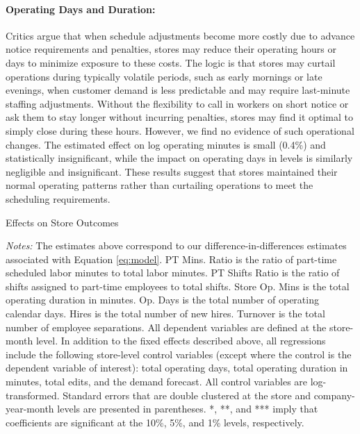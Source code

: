 \documentclass[letterpaper,11pt,leqno]{article}
\theoremstyle{paper}
\newcommand{\note}[2][]{\parbox{\textwidth}{\footnotesize\vspace*{10pt}\textit{#1}#2}}
\begin{document}
\paragraph{Operating Days and Duration:} Critics argue that when schedule adjustments become more costly due to advance notice requirements and penalties, stores may reduce their operating hours or days to minimize exposure to these costs. The logic is that stores may curtail operations during typically volatile periods, such as early mornings or late evenings, when customer demand is less predictable and may require last-minute staffing adjustments. Without the flexibility to call in workers on short notice or ask them to stay longer without incurring penalties, stores may find it optimal to simply close during these hours. However, we find no evidence of such operational changes. The estimated effect on log operating minutes is small (0.4\%) and statistically insignificant, while the impact on operating days in levels is similarly negligible and insignificant. These results suggest that stores maintained their normal operating patterns rather than curtailing operations to meet the scheduling requirements.


\begin{singlespace}
\begin{table}[h]
\caption{Effects on Store Outcomes}

\note{\textit{Notes: } \scriptsize The estimates above correspond to our difference-in-differences estimates associated with Equation \ref{eq:model}.
PT Mins. Ratio is the ratio of part-time scheduled labor minutes to total labor minutes. PT Shifts Ratio is the ratio of shifts assigned to part-time employees to total shifts. Store Op. Mins is the total operating duration in minutes. Op. Days is the total number of operating calendar days. Hires is the total number of new hires. Turnover is the total number of employee separations. All dependent variables are defined at the store-month level. In addition to the fixed effects described above, all regressions include the following store-level control variables (except where the control is the dependent variable of interest): total operating days, total operating duration in minutes, total edits, and the demand forecast. All control variables are log-transformed. Standard errors that are double clustered at the store and company-year-month levels are presented in parentheses. *, **, and *** imply that coefficients are significant at the 10\%, 5\%, and 1\% levels, respectively.}
\label{table:store_level}
\end{table}
\end{singlespace}
\end{document}
